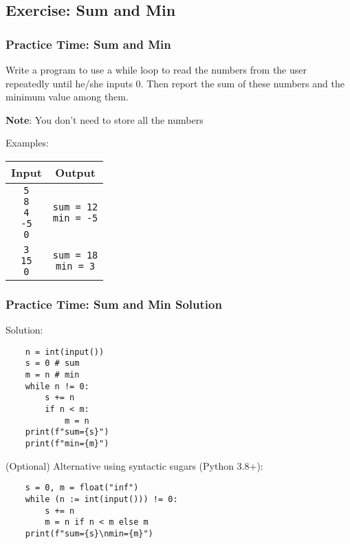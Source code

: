 \documentclass{beamer}
\begin{document}
\subsection{Exercise: Sum and Min}
\begin{frame}[fragile]
    \frametitle{Practice Time: Sum and Min}

    Write a program to use a while loop to read the numbers
    from the user repeatedly until he/she inputs 0.
    Then report the sum of these numbers and the minimum value among them.

    \textbf{Note}: You don't need to store all the numbers

    Examples:

    \begin{tabular}{|c|c|}
        \hline
        Input & Output           \\ \hline
        \makecell[tl]{\texttt{5} \\ \texttt{8} \\ \texttt{4} \\ \texttt{-5} \\ \texttt{0}} & \makecell[tl]{\texttt{sum = 12} \\ \texttt{min = -5}} \\ \hline
        \makecell[tl]{\texttt{3} \\ \texttt{15} \\ \texttt{0}} & \makecell[tl]{\texttt{sum = 18} \\ \texttt{min = 3}} \\ \hline
    \end{tabular}
\end{frame}
\begin{frame}[fragile]
    \frametitle{Practice Time: Sum and Min Solution}

    Solution:
    \begin{verbatim}
    n = int(input())
    s = 0 # sum
    m = n # min
    while n != 0:
        s += n
        if n < m:
            m = n
    print(f"sum={s}")
    print(f"min={m}")
    \end{verbatim}

    (Optional) Alternative using syntactic sugars (Python 3.8+):
    \begin{verbatim}
    s = 0, m = float("inf")
    while (n := int(input())) != 0:
        s += n
        m = n if n < m else m
    print(f"sum={s}\nmin={m}")
    \end{verbatim}
\end{frame}
\end{document}
